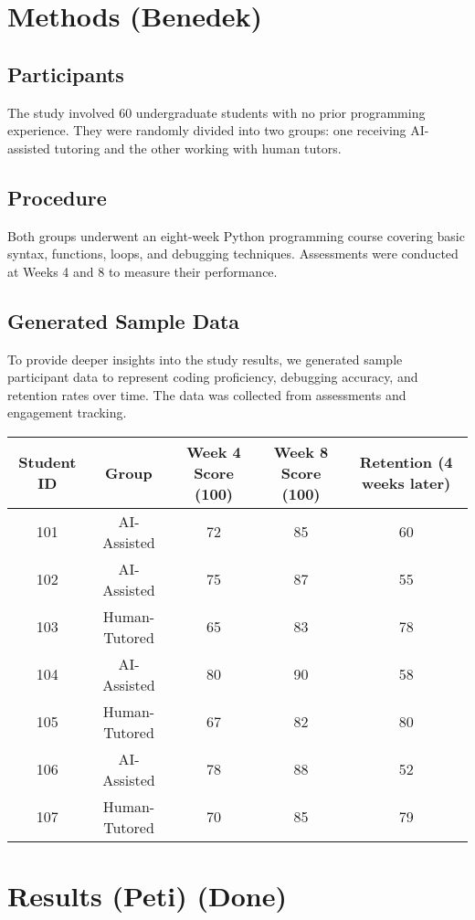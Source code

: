 \documentclass[12pt]{article}  %
\begin{document}
\section{Methods (Benedek)}

\subsection{Participants}
The study involved 60 undergraduate students with no prior programming experience. They were randomly divided into two groups: one receiving AI-assisted tutoring and the other working with human tutors.

\subsection{Procedure}
Both groups underwent an eight-week Python programming course covering basic syntax, functions, loops, and debugging techniques. Assessments were conducted at Weeks 4 and 8 to measure their performance.

\subsection{Generated Sample Data}
To provide deeper insights into the study results, we generated sample participant data to represent coding proficiency, debugging accuracy, and retention rates over time. The data was collected from assessments and engagement tracking.

\begin{longtable}{|c|c|c|c|c|}
    \hline
    Student ID & Group & Week 4 Score (100) & Week 8 Score (100) & Retention (4 weeks later) \\
    \hline
    101 & AI-Assisted & 72 & 85 & 60 \\
    102 & AI-Assisted & 75 & 87 & 55 \\
    103 & Human-Tutored & 65 & 83 & 78 \\
    104 & AI-Assisted & 80 & 90 & 58 \\
    105 & Human-Tutored & 67 & 82 & 80 \\
    106 & AI-Assisted & 78 & 88 & 52 \\
    107 & Human-Tutored & 70 & 85 & 79 \\
    \hline
\end{longtable}
\section{Results (Peti) (Done)}
\end{document}
